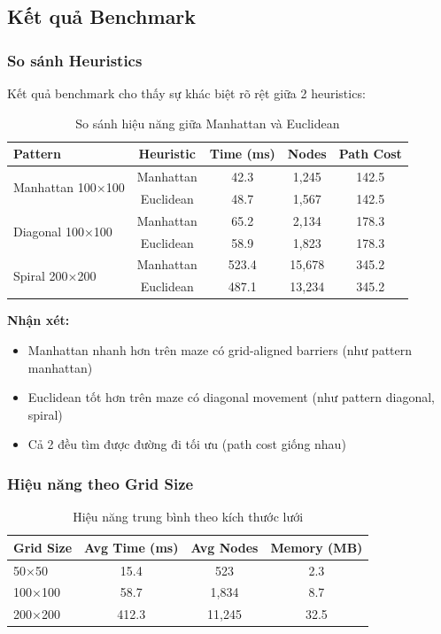\documentclass[12pt,a4paper]{article}
\begin{document}
\subsection{Kết quả Benchmark}

\subsubsection{So sánh Heuristics}
Kết quả benchmark cho thấy sự khác biệt rõ rệt giữa 2 heuristics:

\begin{table}[h]
\centering
\begin{tabular}{|l|c|c|c|c|}
\hline
\textbf{Pattern} & \textbf{Heuristic} & \textbf{Time (ms)} & \textbf{Nodes} & \textbf{Path Cost} \\
\hline
\multirow{2}{*}{Manhattan 100×100} & Manhattan & 42.3 & 1,245 & 142.5 \\
& Euclidean & 48.7 & 1,567 & 142.5 \\
\hline
\multirow{2}{*}{Diagonal 100×100} & Manhattan & 65.2 & 2,134 & 178.3 \\
& Euclidean & 58.9 & 1,823 & 178.3 \\
\hline
\multirow{2}{*}{Spiral 200×200} & Manhattan & 523.4 & 15,678 & 345.2 \\
& Euclidean & 487.1 & 13,234 & 345.2 \\
\hline
\end{tabular}
\caption{So sánh hiệu năng giữa Manhattan và Euclidean}
\end{table}

\textbf{Nhận xét:}
\begin{itemize}
    \item Manhattan nhanh hơn trên maze có grid-aligned barriers (như pattern manhattan)
    \item Euclidean tốt hơn trên maze có diagonal movement (như pattern diagonal, spiral)
    \item Cả 2 đều tìm được đường đi tối ưu (path cost giống nhau)
\end{itemize}

\subsubsection{Hiệu năng theo Grid Size}
\begin{table}[h]
\centering
\begin{tabular}{|l|c|c|c|}
\hline
\textbf{Grid Size} & \textbf{Avg Time (ms)} & \textbf{Avg Nodes} & \textbf{Memory (MB)} \\
\hline
50×50 & 15.4 & 523 & 2.3 \\
100×100 & 58.7 & 1,834 & 8.7 \\
200×200 & 412.3 & 11,245 & 32.5 \\
\hline
\end{tabular}
\caption{Hiệu năng trung bình theo kích thước lưới}
\end{table}
\end{document}
